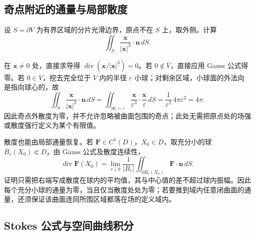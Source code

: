 \subsection{奇点附近的通量与局部散度}

\begin{example}
\label{ex:pei-inverse-square-flux}
设 $S=\partial V$ 为有界区域的分片光滑边界，原点不在 $S$ 上，取外侧。计算
\[
\iint_S\frac{\boldsymbol x}{|\boldsymbol x|^3}\cdot\boldsymbol n\,dS.
\]
\end{example}
\begin{solve}
在 $\boldsymbol x\ne0$ 处，直接求导得 $\operatorname{div}(\boldsymbol x/|\boldsymbol x|^3)=0$。若 $0\notin\overline V$，直接应用 Gauss 公式得零。若 $0\in V$，挖去完全位于 $V$ 内的半径 $\varepsilon$ 小球；对剩余区域，小球面的外法向是指向球心的，故
\[
\iint_S\frac{\boldsymbol x}{|\boldsymbol x|^3}\cdot\boldsymbol n\,dS
=\iint_{|\boldsymbol x|=\varepsilon}
\frac{\boldsymbol x}{\varepsilon^3}\cdot\frac{\boldsymbol x}{\varepsilon}\,dS
=\frac1{\varepsilon^2}\,4\pi\varepsilon^2=4\pi.
\]
因此奇点外散度为零，并不允许忽略被曲面包围的奇点；此处无需把原点处的场强或散度强行定义为某个有限值。
\end{solve}

散度也能由局部通量恢复。若 $\boldsymbol F\in C^1(D)$，$X_0\in D$，取充分小的球 $B_r(X_0)\Subset D$，由 Gauss 公式及散度连续性，
\begin{equation}
\label{eq:pei-local-divergence}
\operatorname{div}\boldsymbol F(X_0)
=\lim_{r\downarrow0}\frac1{|B_r|}
\iint_{\partial B_r(X_0)}\boldsymbol F\cdot\boldsymbol n\,dS.
\end{equation}
证明只需把右端写成散度在球内的平均值，其与中心值的差不超过球内振幅。因此每个充分小球的通量为零，当且仅当散度处处为零；若要推到域内任意闭曲面的通量，还须保证该曲面连同所围区域都落在场的定义域内。

\subsection{Stokes 公式与空间曲线积分}

